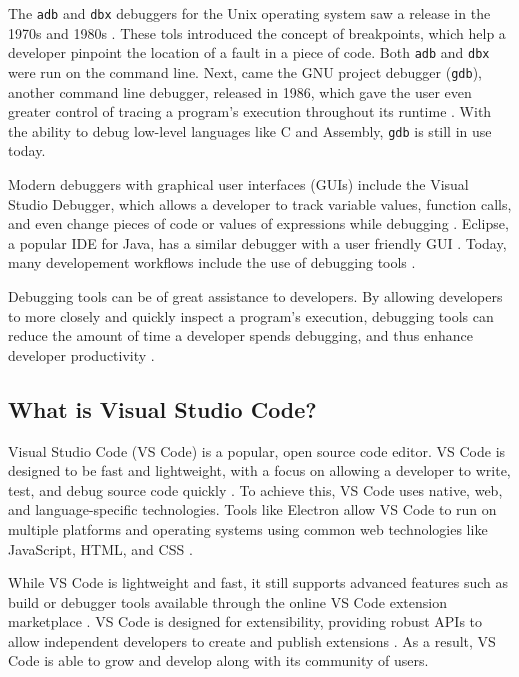 \documentclass{article}
\begin{document}
The \lstinline{adb} and \lstinline{dbx} debuggers for the Unix operating system saw a release in the 1970s and 1980s \cite{BellLaboratories_1983, Linton_1990}. These tols introduced the concept of breakpoints, which help a developer pinpoint the location of a fault in a piece of code. Both \lstinline{adb} and \lstinline{dbx} were run on the command line. Next, came the GNU project debugger (\lstinline{gdb}), another command line debugger, released in 1986, which gave the user even greater control of tracing a program's execution throughout its runtime \cite{GNU_FSF_2023}. With the ability to debug low-level languages like C and Assembly, \lstinline{gdb} is still in use today.

Modern debuggers with graphical user interfaces (GUIs) include the Visual Studio Debugger, which allows a developer to track variable values, function calls, and even change pieces of code or values of expressions while debugging \cite{Microsoft_2022b}. Eclipse, a popular IDE for Java, has a similar debugger with a user friendly GUI \cite{Sinha_2017}. Today, many developement workflows include the use of debugging tools \cite{Matloff_Salzman_2008}.

Debugging tools can be of great assistance to developers. By allowing developers to more closely and quickly inspect a program's execution, debugging tools can reduce the amount of time a developer spends debugging, and thus enhance developer productivity \cite{ZhRaAmRuWo_2008}. 

\subsection{What is Visual Studio Code?}

Visual Studio Code (VS Code) is a popular, open source code editor. VS Code is designed to be fast and lightweight, with a focus on allowing a developer to write, test, and debug source code quickly \cite{Microsoft_2023c}. To achieve this, VS Code uses native, web, and language-specific technologies. Tools like Electron allow VS Code to run on multiple platforms and operating systems using common web technologies like JavaScript, HTML, and CSS \cite{Electron_2023}.

While VS Code is lightweight and fast, it still supports advanced features such as build or debugger tools available through the online VS Code extension marketplace \cite{Microsoft_2023b}. VS Code is designed for extensibility, providing robust APIs to allow independent developers to create and publish extensions \cite{Microsoft_2023d}. As a result, VS Code is able to grow and develop along with its community of users. 
\end{document}
